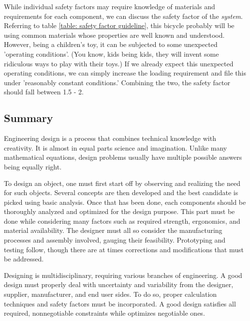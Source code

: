 \documentclass[a4paper,openany,nobib]{tufte-book}
\begin{document}
While individual safety factors may require knowledge of materials and
requirements for each component, we can discuss the safety factor of the
\emph{system}. Referring to table \ref{table: safety factor guideline},
this bicycle probably will be using common materials whose properties
are well known and understood. However, being a children's toy, it can
be subjected to some unexpected 'operating conditions'. (You know, kids
being kids, they will invent some ridiculous ways to play with their
toys.) If we already expect this unexpected operating conditions, we can
simply increase the loading requirement and file this under 'reasonably
constant conditions.' Combining the two, the safety factor should fall
between 1.5 - 2.

\subsection{Summary}
\label{summary}
Engineering design is a process that combines technical knowledge with
creativity. It is almost in equal parts science and imagination. Unlike
many mathematical equations, design problems usually have multiple
possible answers being equally right.

To design an object, one must first start off by observing and realizing
the need for such objects. Several concepts are then developed and the
best candidate is picked using basic analysis. Once that has been done,
each components should be thoroughly analyzed and optimized for the
design purpose. This part must be done while considering many factors
such as required strength, ergonomics, and material availability. The
designer must all so consider the manufacturing processes and assembly
involved, gauging their feasibility. Prototyping and testing follow,
though there are at times corrections and modifications that must be
addressed.

Designing is multidisciplinary, requiring various branches of
engineering. A good design must properly deal with uncertainty and
variability from the designer, supplier, manufacturer, and end user
sides. To do so, proper calculation techniques and safety factors must
be incorporated. A good design satisfies all required, nonnegotiable
constraints while optimizes negotiable ones.
\end{document}
